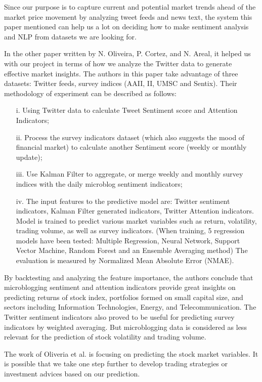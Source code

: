\documentclass[conference]{IEEEtran}
\begin{document}
Since our purpose is to capture current and potential market trends ahead of the market price movement by analyzing tweet feeds and news text, the system this paper mentioned can help us a lot on deciding how to make sentiment analysis and NLP from datasets we are looking for.

In the other paper written by N. Oliveira, P. Cortez, and N. Areal\cite{Oliveira}, it helped us with our project in terms of how we analyze the Twitter data to generate effective market insights. The authors in this paper take advantage of three datasets: Twitter feeds, survey indices (AAII, II, UMSC and Sentix). Their methodology of experiment can be described as follows:
\begin{itemize}
    \item[i.] Using Twitter data to calculate Tweet Sentiment score and Attention Indicators;
    \item[ii.] Process the survey indicators dataset (which also suggests the mood of financial market) to calculate another Sentiment score (weekly or monthly update);
    \item[iii.] Use Kalman Filter to aggregate, or merge weekly and monthly survey indices with the daily microblog sentiment indicators;
    \item[iv.] The input features to the predictive model are: Twitter sentiment indicators, Kalman Filter generated indicators, Twitter Attention indicators. Model is trained to predict various market variables such as return, volatility, trading volume, as well as survey indicators. (When training, 5 regression models have been tested: Multiple Regression, Neural Network, Support Vector Machine, Random Forest and an Ensemble Averaging method) The evaluation is measured by Normalized Mean Absolute Error (NMAE).
\end{itemize}

By backtesting and analyzing the feature importance, the authors conclude that microblogging sentiment and attention indicators provide great insights on predicting returns of stock index, portfolios formed on small capital size, and sectors including Information Technologies, Energy, and Telecommunication. The Twitter sentiment indicators also proved to be useful for predicting survey indicators by weighted averaging. But microblogging data is considered as less relevant for the prediction of stock volatility and trading volume.

The work of Oliveria et al. is focusing on predicting the stock market variables. It is possible that we take one step further to develop trading strategies or investment advices based on our prediction.
\end{document}

